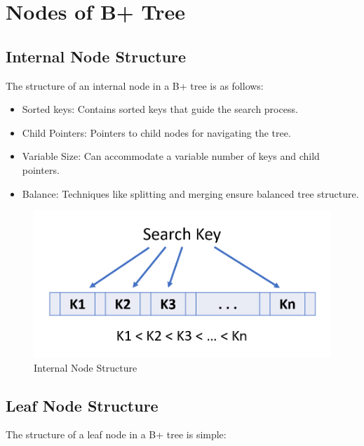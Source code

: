 \documentclass{article}
\begin{document}
    \section{Nodes of B+ Tree}
    \subsection{Internal Node Structure}
    The structure of an internal node in a B+ tree is as follows:

    \begin{itemize}
        \item Sorted keys: Contains sorted keys that guide the search process.
        \item Child Pointers: Pointers to child nodes for navigating the tree.
        \item Variable Size: Can accommodate a variable number of keys and child pointers.
        \item Balance: Techniques like splitting and merging ensure balanced tree structure.
    \end{itemize}
    \begin{figure}[ht]
        \centering
        \includegraphics[scale = 0.4]{Images/InternalNode.png}
        \caption{Internal Node Structure}
    \end{figure}
    \subsection{Leaf Node Structure}
    The structure of a leaf node in a B+ tree is simple:
\end{document}
